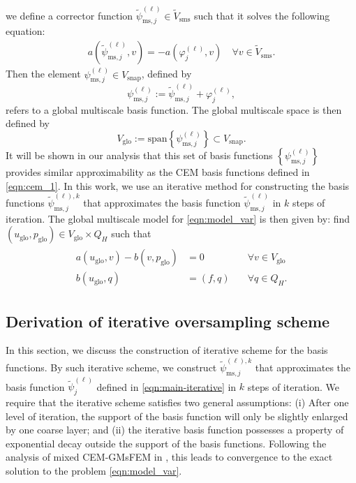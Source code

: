\documentclass{article}[11pt]
\theoremstyle{definition}
\begin{document}
we define a corrector function $\tilde \psi_{\text{ms},j}^{(\ell)} \in \tilde V_{\text{sms}}$ such that it solves the following equation: 
\begin{eqnarray}\label{eqn:main-iterative}
a\left (\tilde \psi_{\text{ms},j}^{(\ell)}, v \right) = - a\left (\varphi_j^{(\ell)}, v\right) \quad \forall v \in \tilde V_{\text{sms}}.
\end{eqnarray}
Then the element $\psi^{(\ell)}_{\text{ms},j} \in V_{\text{snap}}$, defined by 
\begin{equation}\label{eqn:glo_basis}
\psi^{(\ell)}_{\text{ms},j}:=\tilde \psi^{(\ell)}_{\text{ms},j} + \varphi^{(\ell)}_j,
\end{equation}
refers to a global multiscale basis function. 
The global multiscale space is then defined by 
$$V_{\text{glo}} :=\text{span}\left \{\psi^{(\ell)}_{\text{ms},j} \right \} \subset V_{\text{snap}}.$$
It will be shown in our analysis that this set of basis functions $\left \{ \psi_{\text{ms},j}^{(\ell)} \right \}$ provides similar approximability as the CEM basis functions defined in \eqref{eqn:cem_1}. In this work, we use an iterative method for constructing the basis functions $\tilde \psi_{\text{ms}, j}^{(\ell), k}$ that approximates the basis function $\tilde \psi_{\text{ms},j}^{(\ell)}$ in $k$ steps of iteration. 
The global multiscale model for \eqref{eqn:model_var} is then given by: find 
$(u_{\text{glo}}, p_{\text{glo}}) \in V_{\text{glo}} \times Q_H$ such that 
\begin{eqnarray}\label{eqn:glo_msm}
\begin{split}
a(u_{\text{glo}},v)-b(v,p_{\text{glo}}) & =0& \quad \forall v\in V_{\text{glo}}\\
b(u_{\text{glo}},q) & =(f,q)& \quad \forall q\in Q_{H}. 
\end{split}
\end{eqnarray}


\subsection{Derivation of iterative oversampling scheme}

\noindent
In this section, we discuss the construction of iterative scheme for the basis functions.  By such iterative scheme, we construct $\tilde \psi_{\text{ms}, j}^{(\ell), k}$ that approximates the basis function $\tilde \psi_j^{(\ell)}$ defined in \eqref{eqn:main-iterative} in $k$ steps of iteration. We require that the iterative scheme satisfies two general assumptions: (i) After one level of iteration, the support of the basis function will only be slightly enlarged by one coarse layer; and (ii) the iterative basis function possesses a property of exponential decay outside the support of the basis functions. Following the analysis of mixed CEM-GMsFEM in \cite{chung2018constraintmixed}, this leads to convergence to the exact solution to the problem \eqref{eqn:model_var}. 
\end{document}
